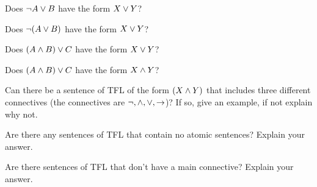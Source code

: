 \begin{practiceproblems}
	
	\problempart
	\begin{problemslist}
		\item  Does $\neg A\vee B$ have the form $X\vee Y$?
		\item Does $\neg(A\vee B)$ have the form $X\vee Y$?
		\item Does $(A\mathbin{\wedge} B)\vee C$ have the form $X\vee Y$?
		\item Does $(A\mathbin{\wedge} B)\vee C$ have the form $X\mathbin{\wedge}Y$?
	\end{problemslist}
	\problempart
	\begin{problemslist}
		\item Can there be a sentence of TFL of the form $(X\mathbin{\wedge}Y)$ that includes three different connectives (the connectives are $\neg,\mathbin{\wedge},\vee,\rightarrow$)? If so, give an example, if not explain why not.
		\item Are there any sentences of TFL that contain no atomic sentences? Explain your answer.
		\\
		\item Are there sentences of TFL that don't have a main connective? Explain your answer.
	\end{problemslist}
	
\end{practiceproblems}
%
%
% 
